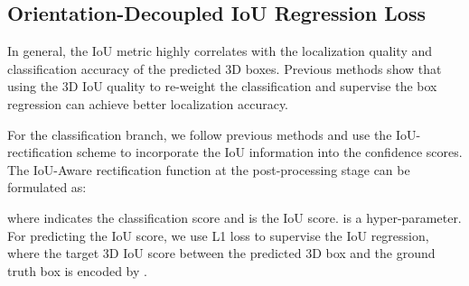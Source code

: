 \documentclass[runningheads]{llncs}
\begin{document}
\subsection{Orientation-Decoupled IoU Regression Loss}
In general, the IoU metric highly correlates with the localization quality and classification accuracy of the predicted 3D boxes. Previous methods \cite{liang2021rangeioudet}
show that using the 3D IoU quality to re-weight the classification and supervise the box regression can achieve better localization accuracy. 

For the classification branch, we follow previous methods \cite{Hu2021AFDetV2RT,zheng2020ciassd} and use the IoU-rectification scheme to incorporate the IoU information into the confidence scores.
The IoU-Aware rectification function \cite{Hu2021AFDetV2RT} at the post-processing stage can be formulated as:

where  indicates the classification score and  is the IoU score.  is a hyper-parameter.
For predicting the IoU score, we use L1 loss  to supervise the IoU regression, where the target 3D IoU score  between the predicted 3D box and the ground truth box is encoded by .
\end{document}
